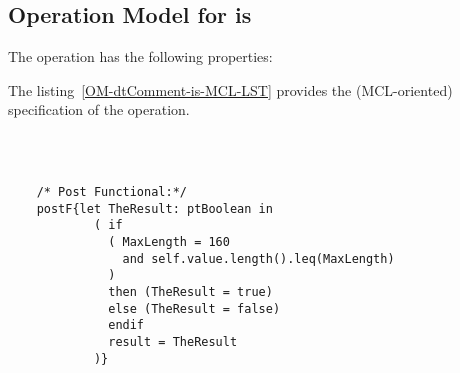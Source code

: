 \subsection{Operation Model for is}

\label{OM-is}


The  operation has the following properties:

	\begin{operationmodel}



		


	\end{operationmodel}



	\vspace{1cm}
	The listing~\ref{OM-dtComment-is-MCL-LST} provides the \msrmessir (MCL-oriented) specification of the operation.
	
	\scriptsize
	\vspace{0.5cm}
	\begin{lstlisting}[style=MessirStyle,firstnumber=auto,captionpos=b,caption={\msrmessir (MCL-oriented) specification of the operation \emph{is}.},label=OM-dtComment-is-MCL-LST]

	
	
	/* Post Functional:*/ 
	postF{let TheResult: ptBoolean in
	        ( if
	          ( MaxLength = 160
	            and self.value.length().leq(MaxLength)
	          )
	          then (TheResult = true)
	          else (TheResult = false)
	          endif
	          result = TheResult
	        )}
	
	
	\end{lstlisting}
	\normalsize 
	
	
	
	





